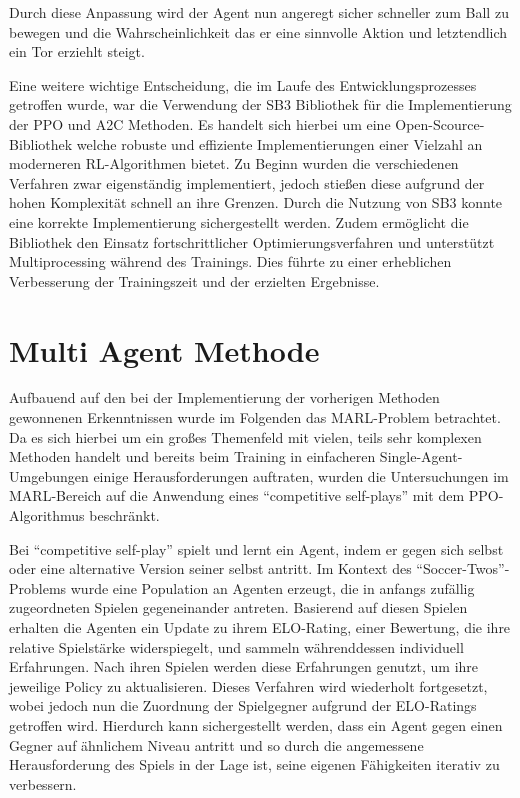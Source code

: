 Durch diese Anpassung wird der Agent nun angeregt sicher schneller zum Ball zu bewegen und die Wahrscheinlichkeit das er eine sinnvolle Aktion und letztendlich ein Tor erziehlt steigt.

Eine weitere wichtige Entscheidung, die im Laufe des Entwicklungsprozesses getroffen wurde, war die Verwendung der \ac{SB3} Bibliothek \cite{stable-baselines3} für die Implementierung der \ac{PPO} und \ac{A2C} Methoden. Es handelt sich hierbei um eine Open-Scource-Bibliothek welche robuste und effiziente Implementierungen einer Vielzahl an moderneren \ac{RL}-Algorithmen bietet.
Zu Beginn wurden die verschiedenen Verfahren zwar eigenständig implementiert, jedoch stießen diese aufgrund der hohen Komplexität schnell an ihre Grenzen. Durch die Nutzung von \ac{SB3} konnte eine korrekte Implementierung sichergestellt werden. Zudem ermöglicht die Bibliothek den Einsatz fortschrittlicher Optimierungsverfahren und unterstützt Multiprocessing während des Trainings. Dies führte zu einer erheblichen Verbesserung der Trainingszeit und der erzielten Ergebnisse.

\section{Multi Agent Methode}

 Aufbauend auf den bei der Implementierung der vorherigen Methoden gewonnenen Erkenntnissen wurde im Folgenden das \ac{MARL}-Problem betrachtet. Da es sich hierbei um ein großes Themenfeld mit vielen, teils sehr komplexen Methoden handelt und bereits beim Training in einfacheren Single-Agent-Umgebungen einige Herausforderungen auftraten, wurden die Untersuchungen im \ac{MARL}-Bereich auf die Anwendung eines \enquote{competitive self-plays} mit dem \ac{PPO}-Algorithmus beschränkt.
 
 Bei \enquote{competitive self-play} spielt und lernt ein Agent, indem er gegen sich selbst oder eine alternative Version seiner selbst antritt. Im Kontext des \enquote{Soccer-Twos}-Problems wurde eine Population an Agenten erzeugt, die in anfangs zufällig zugeordneten Spielen gegeneinander antreten. Basierend auf diesen Spielen erhalten die Agenten ein Update zu ihrem ELO-Rating, einer Bewertung, die ihre relative Spielstärke widerspiegelt, und sammeln währenddessen individuell Erfahrungen. Nach ihren Spielen werden diese Erfahrungen genutzt, um ihre jeweilige Policy zu aktualisieren. Dieses Verfahren wird wiederholt fortgesetzt, wobei jedoch nun die Zuordnung der Spielgegner aufgrund der ELO-Ratings getroffen wird. Hierdurch kann sichergestellt werden, dass ein Agent gegen einen Gegner auf ähnlichem Niveau antritt und so durch die angemessene Herausforderung des Spiels in der Lage ist, seine eigenen Fähigkeiten iterativ zu verbessern.